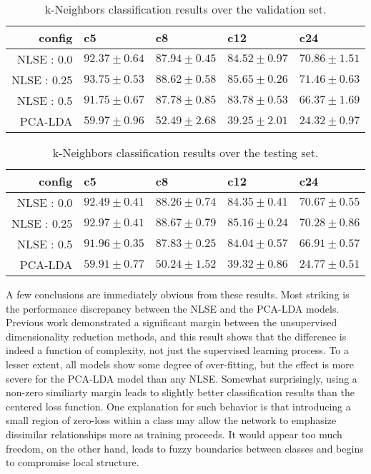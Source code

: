 \begin{table*}[h]
\begin{center}
\caption{k-Neighbors classification results over the validation set.}
\small
\begin{tabular}{rllll}
\hline
config & c5  & c8 & c12   & c24     \\
\hline
 NLSE : 0.0  & $92.37\pm0.64$ & $87.94\pm0.45$ & $84.52\pm0.97$ & $70.86\pm1.51$ \\
 NLSE : 0.25 & $93.75\pm0.53$ & $88.62\pm0.58$ & $85.65\pm0.26$ & $71.46\pm0.63$ \\
 NLSE : 0.5  & $91.75\pm0.67$ & $87.78\pm0.85$ & $83.78\pm0.53$ & $66.37\pm1.69$ \\
 \hline
 PCA-LDA & $59.97\pm0.96$ & $52.49\pm2.68$ & $39.25\pm2.01$ & $24.32\pm0.97$ \\
\hline
\end{tabular}
\label{tab:valid}
\end{center}
\end{table*}

\begin{table*}[h]
\begin{center}
\caption{k-Neighbors classification results over the testing set.}
\small
\begin{tabular}{rllll}
\hline
config & c5  & c8  & c12   & c24   \\
\hline
 NLSE : 0.0  & $92.49\pm0.41$ & $88.26\pm0.74$ & $84.35\pm0.41$ & $70.67\pm0.55$ \\
 NLSE : 0.25 & $92.97\pm0.41$ & $88.67\pm0.79$ & $85.16\pm0.24$ & $70.28\pm0.86$ \\
 NLSE : 0.5  & $91.96\pm0.35$ & $87.83\pm0.25$ & $84.04\pm0.57$ & $66.91\pm0.57$ \\
 \hline
 PCA-LDA  & $59.91\pm0.77$ & $50.24\pm1.52$ & $39.32\pm0.86$ & $24.77\pm0.51$ \\
\hline
\end{tabular}
\label{tab:test}
\end{center}
\end{table*}


A few conclusions are immediately obvious from these results.
Most striking is the performance discrepancy between the NLSE and the PCA-LDA models.
Previous work demonstrated a significant margin between the unsupervised dimensionality reduction methods, and this result shows that the difference is indeed a function of complexity, not just the supervised learning process.
To a lesser extent, all models show some degree of over-fitting, but the effect is more severe for the PCA-LDA model than any NLSE.
Somewhat surprisingly, using a non-zero similiarty margin leads to slightly better classification results than the centered loss function.
One explanation for such behavior is that introducing a small region of zero-loss within a class may allow the network to emphasize dissimilar relationships more as training proceeds.
It would appear too much freedom, on the other hand, leads to fuzzy boundaries between classes and begins to compromise local structure.


